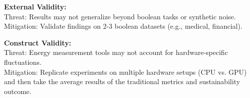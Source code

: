 \documentclass[conference]{IEEEtran}
\begin{document}
\vspace{0.5em}
\textbf{External Validity:}\\
Threat: Results may not generalize beyond boolean tasks or synthetic noise. Mitigation: Validate findings on 2-3 boolean datasets (e.g., medical, financial).



\textbf{Construct Validity:}\\[0.5em]
Threat: Energy measurement tools may not account for hardware-specific fluctuations.\\[0.5em]
Mitigation: Replicate experiments on multiple hardware setups (CPU vs. GPU) and then take the average results of the traditional metrics and sustainability outcome.





\end{document}
